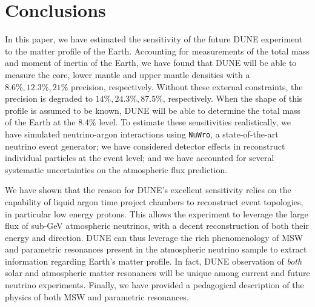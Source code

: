 \section{Conclusions}
\label{sec:Conclusions}
In this paper, we have estimated the sensitivity of the future DUNE experiment to the matter profile of the Earth.
Accounting for measurements of the total mass and moment of inertia of the Earth, we have found that DUNE will be able to measure the core, lower mantle and upper mantle densities with a $8.6\%, 12.3\%, 21\%$ precision, respectively.
Without these external constraints, the precision is degraded to $14\%, 24.3\%, 87.5\%$, respectively. 
When the shape of this profile is assumed to be known, DUNE will be able to determine the total mass of the Earth at the 8.4\% level.
To estimate these sensitivities realistically, we have simulated neutrino-argon interactions using \texttt{NuWro}, a state-of-the-art neutrino event generator; we have considered detector effects in reconstruct individual particles at the event level; and we have accounted for several systematic uncertainties on the atmospheric flux prediction.

We have shown that the reason for DUNE's excellent sensitivity relies on the capability of liquid argon time project chambers to reconstruct event topologies, in particular low energy protons.
This allows the experiment to leverage the large flux of  sub-GeV atmospheric neutrinos, with a decent reconstruction of both their energy and direction.
DUNE can thus leverage the rich phenomenology of MSW and parametric resonances present in the atmospheric neutrino sample to extract information regarding Earth's matter profile.
In fact, DUNE observation of \emph{both} solar and atmospheric matter resonances will be unique among current and future neutrino experiments.
Finally, we have provided a pedagogical description of the physics of both MSW and parametric resonances.


